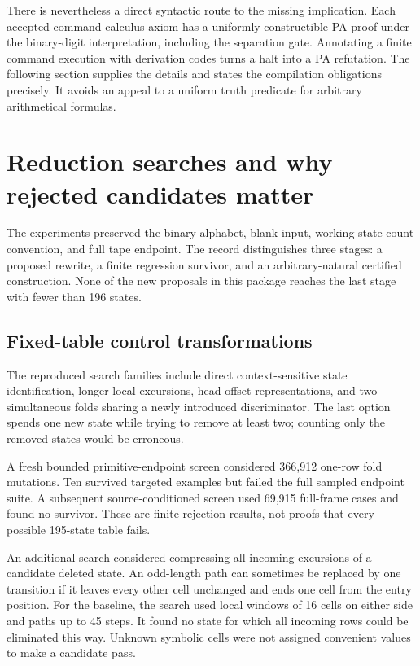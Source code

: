 \documentclass[11pt,letterpaper]{article}
\begin{document}
There is nevertheless a direct syntactic route to the missing implication.
Each accepted command-calculus axiom has a uniformly constructible PA
proof under the binary-digit interpretation, including the separation
gate. Annotating a finite command execution with derivation codes turns a
halt into a PA refutation. The following section supplies the details and
states the compilation obligations precisely. It avoids an appeal to a
uniform truth predicate for arbitrary arithmetical formulas.



\section{Reduction searches and why rejected candidates matter}
\label{sec:search}

The experiments preserved the binary alphabet, blank input, working-state
count convention, and full tape endpoint. The record distinguishes three
stages: a proposed rewrite, a finite regression survivor, and an
arbitrary-natural certified construction. None of the new proposals in
this package reaches the last stage with fewer than 196 states.

\subsection{Fixed-table control transformations}

The reproduced search families include direct context-sensitive state
identification, longer local excursions, head-offset representations,
and two simultaneous folds sharing a newly introduced discriminator.
The last option spends one new state while trying to remove at least two;
counting only the removed states would be erroneous.

A fresh bounded primitive-endpoint screen considered 366,912 one-row
fold mutations. Ten survived targeted examples but failed the full
sampled endpoint suite. A subsequent source-conditioned screen used
69,915 full-frame cases and found no survivor. These are finite rejection
results, not proofs that every possible 195-state table fails.

An additional search considered compressing all incoming excursions of a
candidate deleted state. An odd-length path can sometimes be replaced by
one transition if it leaves every other cell unchanged and ends one cell
from the entry position. For the baseline, the search used local windows
of 16 cells on either side and paths up to 45 steps. It found no state for
which all incoming rows could be eliminated this way. Unknown symbolic
cells were not assigned convenient values to make a candidate pass.
\end{document}
